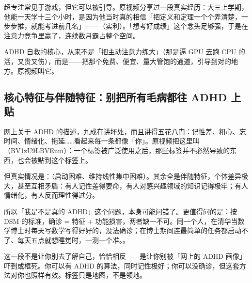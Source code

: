 超专注常见于游戏，但它可以被引导。原视频分享过一段真实经历：大三上学期，他能一天学十三个小时，是因为他当时真的相信「把定义和定理一个个弄清楚，一步步推，就能考进前几名」——（实利）。「想考好成绩」这个念头足够强，于是在注意力竞争里赢了，连续数月霸占整个空间。

\begin{insight}
ADHD 自救的核心，从来不是「把主动注意力练大」（那是逼 GPU 去跑 CPU 的活，又贵又伤），而是——把那个免费、便宜、量大管饱的通道，引导到对的地方。原视频叫它。
\end{insight}

\subsection{核心特征与伴随特征：别把所有毛病都往 ADHD 上贴}

网上关于 ADHD 的描述，九成在讲坏处，而且讲得五花八门：记性差、粗心、忘时间、情绪化、拖延……看起来每一条都像「你」。原视频把这里叫（BV1zU9LBVEnm）：一个标签被广泛使用之后，那些标签并不必然导致的东西，也会被贴到这个标签上。

但真实情况是：（启动困难、维持线性集中困难）。其余全是伴随特征，个体差异极大，甚至互相矛盾：有人记性差得要命，有人对感兴趣领域的知识记得极牢；有人情绪化，有人反而理性得过分。

所以「我是不是真的 ADHD」这个问题，本身可能问错了。更值得问的是：按 DSM 的标准，确诊 = 特征 + 功能损害，两者缺一不可。同一个人，在清华当数学博士时每天写数学写得好好的，没法确诊；在博士期间连最简单的任务都启动不了、每天五点就想睡觉时，一测一个准。。

\begin{notehot}
这一段不是让你别去了解自己，恰恰相反——是让你别被「网上的 ADHD 画像」吓到或框死。你可以有 ADHD 的算法，同时记性极好；你可以没确诊，但这套方法对你也照样有效。标签只是地图，不是领地。
\end{notehot}

